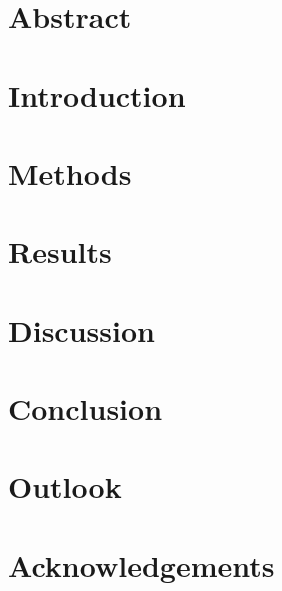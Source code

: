 \documentclass{ifd-miniposter}
\begin{document}

\maketitle
\newpage
\thispagestyle{empty}
\null
\newpage
\section*{Abstract}

\newpage
\tableofcontents
\newpage
\section{Introduction}

\section{Methods}

\section{Results}

\section{Discussion}

\section{Conclusion}

\section{Outlook}

\newpage
\section*{Acknowledgements}

\newpage

\end{document}
